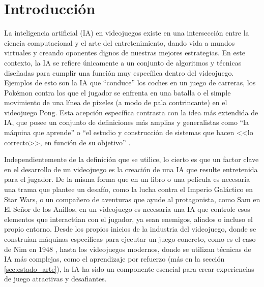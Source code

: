 \chapter{Introducción} \label{chap:introduccion}


La inteligencia artificial (IA) en videojuegos existe en una intersección entre la ciencia computacional y el arte del entretenimiento, dando vida a mundos virtuales y creando oponentes dignos de nuestras mejores estrategias. En este contexto, la IA se refiere únicamente a un conjunto de algoritmos y técnicas diseñadas para cumplir una función muy específica dentro del videojuego. Ejemplos de esto son la IA que ``conduce'' los coches en un juego de carreras, los Pokémon contra los que el jugador se enfrenta en una batalla o el simple movimiento de una línea de píxeles (a modo de pala contrincante) en el videojuego Pong. Esta acepción específica contrasta con la idea más extendida de IA, que posee un conjunto de definiciones más amplias y generalistas como ``la máquina que aprende'' o ``el estudio y construcción de sistemas que hacen <<lo correcto>>, en función de su objetivo'' \cite{russell_artificial_2021}.

Independientemente de la definición que se utilice, lo cierto es que un factor clave en el desarrollo de un videojuego es la creación de una IA que resulte entretenida para el jugador. De la misma forma que en un libro o una película es necesaria una trama que plantee un desafío, como la lucha contra el Imperio Galáctico en Star Wars, o un compañero de aventuras que ayude al protagonista, como Sam en El Señor de los Anillos, en un videojuego es necesaria una IA que controle esos elementos que interactúan con el jugador, ya sean enemigos, aliados o incluso el propio entorno. Desde los propios inicios de la industria del videojuego, donde se construían máquinas específicas para ejecutar un juego concreto, como es el caso de Nim en 1948 \cite{redheffer_machine_1948}, hasta los videojuegos modernos, donde se utilizan técnicas de IA más complejas, como el aprendizaje por refuerzo (más en la sección \ref{sec:estado_arte}), la IA ha sido un componente esencial para crear experiencias de juego atractivas y desafiantes.


